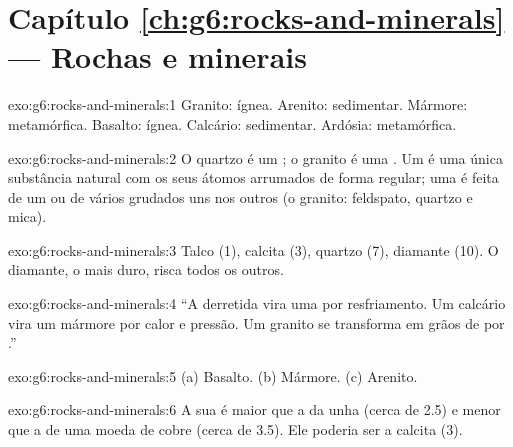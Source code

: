 \section*{Capítulo \ref{ch:g6:rocks-and-minerals} --- Rochas e minerais}

\begin{solution}{exo:g6:rocks-and-minerals:1}
Granito: ígnea. Arenito: sedimentar. Mármore: metamórfica. Basalto: ígnea.
Calcário: sedimentar. Ardósia: metamórfica.
\end{solution}

\begin{solution}{exo:g6:rocks-and-minerals:2}
O quartzo é um ; o granito é uma . Um  é uma única
substância natural com os seus átomos arrumados de forma regular; uma 
é feita de um ou de vários  grudados uns nos outros (o granito:
feldspato, quartzo e mica).
\end{solution}

\begin{solution}{exo:g6:rocks-and-minerals:3}
Talco (1), calcita (3), quartzo (7), diamante (10). O diamante, o mais
duro, risca todos os outros.
\end{solution}

\begin{solution}{exo:g6:rocks-and-minerals:4}
``A  derretida vira uma  por resfriamento. Um calcário vira
um mármore por calor e pressão. Um granito se transforma em grãos de 
por .''
\end{solution}

\begin{solution}{exo:g6:rocks-and-minerals:5}
(a) Basalto. (b) Mármore. (c) Arenito.
\end{solution}

\begin{solution}{exo:g6:rocks-and-minerals:6}
A sua  é maior que a da unha (cerca de 2.5) e menor que a de uma
moeda de cobre (cerca de 3.5). Ele poderia ser a calcita (3).
\end{solution}

